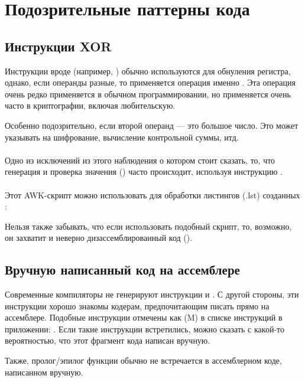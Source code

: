 \section{Подозрительные паттерны кода}

\subsection{Инструкции XOR}

Инструкции вроде  (например, ) 
обычно используются для обнуления регистра,
однако, если операнды разные, то применяется операция именно .
Эта операция очень редко применяется в обычном программировании, но применяется очень часто в криптографии,
включая любительскую.

Особенно подозрительно, если второй операнд --- это большое число.
Это может указывать на шифрование, вычисление контрольной суммы, итд.  \\
\\
Одно из исключений из этого наблюдения о котором стоит сказать, то, что генерация и проверка значения 
() часто происходит, используя инструкцию \XOR.  \\
\\
Этот AWK-скрипт можно использовать для обработки листингов (.lst) созданных \IDA{}:



Нельзя также забывать,
что если использовать подобный скрипт, то, возможно, он захватит и неверно дизассемблированный
код 
().

\subsection{Вручную написанный код на ассемблере}

Современные компиляторы не генерируют инструкции  и . 
С другой стороны, эти инструкции хорошо знакомы кодерам, предпочитающим писать прямо на ассемблере. 
Подобные инструкции отмечены как (M) в списке инструкций в приложении: 
.
Если такие инструкции встретились, можно сказать с какой-то вероятностью, что этот фрагмент кода написан вручную.

\par
Также, пролог/эпилог функции обычно не встречается в ассемблерном коде, написанном вручную.

